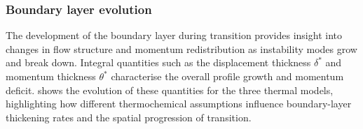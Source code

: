 
\subsubsection{Boundary layer evolution}

The development of the boundary layer during transition provides insight into changes in flow structure and momentum redistribution as instability modes grow and break down. Integral quantities such as the displacement thickness $\delta^*$ and momentum thickness $\theta^*$ characterise the overall profile growth and momentum deficit.  shows the evolution of these quantities for the three thermal models, highlighting how different thermochemical assumptions influence boundary-layer thickening rates and the spatial progression of transition.

